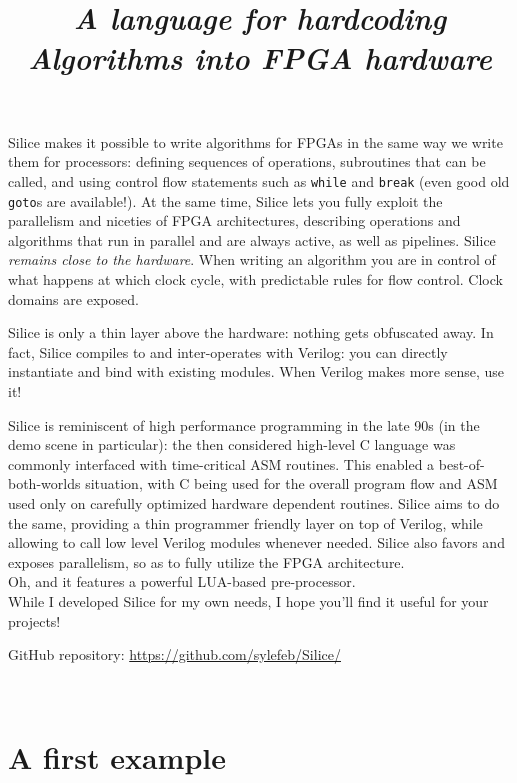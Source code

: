 \documentclass[a4]{article}
\title{\silice{}\\ \textit{\normalsize A language for hardcoding Algorithms into FPGA hardware}}
\newcommand\verilog{Verilog}
\newcommand\silice{Silice}
\begin{document}
\maketitle

\silice{} makes it possible to write algorithms for FPGAs in the same way we write them for processors: defining sequences of operations, subroutines that can be called, and using control flow statements such as \texttt{while} and \texttt{break} (even good old \texttt{goto}s are available!). 
At the same time, \silice{} lets you fully exploit the parallelism and niceties of FPGA architectures, describing operations and algorithms that run in parallel and are always active, as well as pipelines.
\silice{} \textit{remains close to the hardware}. When writing an algorithm you are in control of what happens at which clock cycle, with predictable rules for flow control. Clock domains are exposed. 

\silice{} is only a thin layer above the hardware: nothing gets obfuscated away. In fact, \silice{} compiles to and inter-operates with \verilog{}: you can directly instantiate and bind with existing modules. When \verilog{} makes more sense, use it!

\silice{} is reminiscent of high performance programming in the late 90s (in the demo scene in particular): the then considered high-level C language was commonly interfaced with time-critical ASM routines. This enabled a best-of-both-worlds situation, with C being used for the overall program flow and ASM used only on carefully optimized hardware dependent routines.
%
\silice{} aims to do the same, providing a thin programmer friendly layer on top of \verilog{}, while allowing to call low level \verilog{} modules whenever needed.
\silice{} also favors and exposes parallelism, so as to fully utilize the FPGA architecture.\\

Oh, and it features a powerful LUA-based pre-processor.\\

\noindent While I developed \silice{} for my own needs, I hope you'll find it useful for your projects!

\vspace*{5mm}
\noindent
{\parbox{\dimexpr\linewidth-2\fboxsep-2\fboxrule}{GitHub repository: \url{https://github.com/sylefeb/Silice/}}}\\

	
\section{A first example}
\end{document}
